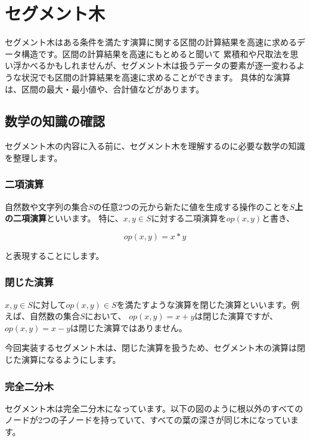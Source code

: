 \documentclass{jlreq}
\begin{document}
\newpage

\section{セグメント木}
セグメント木はある条件を満たす演算に関する区間の計算結果を高速に求めるデータ構造です。区間の計算結果を高速にもとめると聞いて
累積和や尺取法を思い浮かべるかもしれませんが、セグメント木は扱うデータの要素が逐一変わるような状況でも区間の計算結果を高速に求めることができます。
具体的な演算は、区間の最大・最小値や、合計値などがあります。

\subsection{数学の知識の確認}
セグメント木の内容に入る前に、セグメント木を理解するのに必要な数学の知識を整理します。

\subsubsection{二項演算}

自然数や文字列の集合$S$の任意2つの元から新たに値を生成する操作のことを\textbf{$S$上の二項演算}といいます。
特に、$x, y \in S$に対する二項演算を$op(x, y)$と書き、

\begin{equation*}
	op(x, y) = x * y
\end{equation*}

と表現することにします。

\subsubsection{閉じた演算}
$x, y \in S$に対して$op(x, y) \in S$を満たすような演算を閉じた演算といいます。例えば、自然数の集合$S$において、
$op(x, y) = x + y$は閉じた演算ですが、$op(x, y) = x - y$は閉じた演算ではありません。

今回実装するセグメント木は、閉じた演算を扱うため、セグメント木の演算は閉じた演算になるようにします。

\subsubsection{完全二分木}
セグメント木は完全二分木になっています。以下の図のように根以外のすべてのノードが2つの子ノードを持っていて、すべての葉の深さが同じ木になっています。

\vspace{0.25cm}
\end{document}
